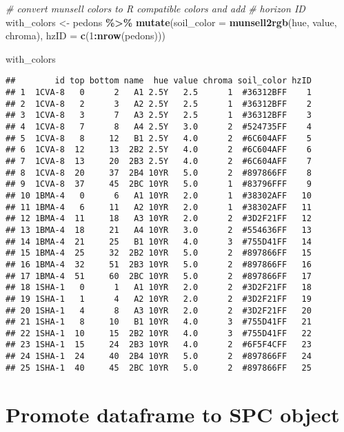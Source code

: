 \documentclass[
]{book}
\newenvironment{Shaded}{\begin{snugshade}}{\end{snugshade}}
\newcommand{\CommentTok}[1]{\textcolor[rgb]{0.56,0.35,0.01}{\textit{#1}}}
\newcommand{\DataTypeTok}[1]{\textcolor[rgb]{0.13,0.29,0.53}{#1}}
\newcommand{\DecValTok}[1]{\textcolor[rgb]{0.00,0.00,0.81}{#1}}
\newcommand{\KeywordTok}[1]{\textcolor[rgb]{0.13,0.29,0.53}{\textbf{#1}}}
\newcommand{\NormalTok}[1]{#1}
\newcommand{\OperatorTok}[1]{\textcolor[rgb]{0.81,0.36,0.00}{\textbf{#1}}}
\newcommand{\StringTok}[1]{\textcolor[rgb]{0.31,0.60,0.02}{#1}}
\begin{document}
\begin{Shaded}
\begin{Highlighting}[]
\CommentTok{\# convert munsell colors to R compatible colors and add}
\CommentTok{\# horizon ID}
\NormalTok{with\_colors \textless{}{-}}\StringTok{ }\NormalTok{pedons }\OperatorTok{\%\textgreater{}\%}\StringTok{ }\KeywordTok{mutate}\NormalTok{(}\DataTypeTok{soil\_color =} \KeywordTok{munsell2rgb}\NormalTok{(hue, }
\NormalTok{    value, chroma), }\DataTypeTok{hzID =} \KeywordTok{c}\NormalTok{(}\DecValTok{1}\OperatorTok{:}\KeywordTok{nrow}\NormalTok{(pedons)))}

\NormalTok{with\_colors}
\end{Highlighting}
\end{Shaded}

\begin{verbatim}
##        id top bottom name  hue value chroma soil_color hzID
## 1  1CVA-8   0      2   A1 2.5Y   2.5      1  #36312BFF    1
## 2  1CVA-8   2      3   A2 2.5Y   2.5      1  #36312BFF    2
## 3  1CVA-8   3      7   A3 2.5Y   2.5      1  #36312BFF    3
## 4  1CVA-8   7      8   A4 2.5Y   3.0      2  #524735FF    4
## 5  1CVA-8   8     12   B1 2.5Y   4.0      2  #6C604AFF    5
## 6  1CVA-8  12     13  2B2 2.5Y   4.0      2  #6C604AFF    6
## 7  1CVA-8  13     20  2B3 2.5Y   4.0      2  #6C604AFF    7
## 8  1CVA-8  20     37  2B4 10YR   5.0      2  #897866FF    8
## 9  1CVA-8  37     45  2BC 10YR   5.0      1  #83796FFF    9
## 10 1BMA-4   0      6   A1 10YR   2.0      1  #38302AFF   10
## 11 1BMA-4   6     11   A2 10YR   2.0      1  #38302AFF   11
## 12 1BMA-4  11     18   A3 10YR   2.0      2  #3D2F21FF   12
## 13 1BMA-4  18     21   A4 10YR   3.0      2  #554636FF   13
## 14 1BMA-4  21     25   B1 10YR   4.0      3  #755D41FF   14
## 15 1BMA-4  25     32  2B2 10YR   5.0      2  #897866FF   15
## 16 1BMA-4  32     51  2B3 10YR   5.0      2  #897866FF   16
## 17 1BMA-4  51     60  2BC 10YR   5.0      2  #897866FF   17
## 18 1SHA-1   0      1   A1 10YR   2.0      2  #3D2F21FF   18
## 19 1SHA-1   1      4   A2 10YR   2.0      2  #3D2F21FF   19
## 20 1SHA-1   4      8   A3 10YR   2.0      2  #3D2F21FF   20
## 21 1SHA-1   8     10   B1 10YR   4.0      3  #755D41FF   21
## 22 1SHA-1  10     15  2B2 10YR   4.0      3  #755D41FF   22
## 23 1SHA-1  15     24  2B3 10YR   4.0      2  #6F5F4CFF   23
## 24 1SHA-1  24     40  2B4 10YR   5.0      2  #897866FF   24
## 25 1SHA-1  40     45  2BC 10YR   5.0      2  #897866FF   25
\end{verbatim}

\hypertarget{promote-dataframe-to-spc-object}{%
\section{Promote dataframe to SPC object}\label{promote-dataframe-to-spc-object}}
\end{document}
